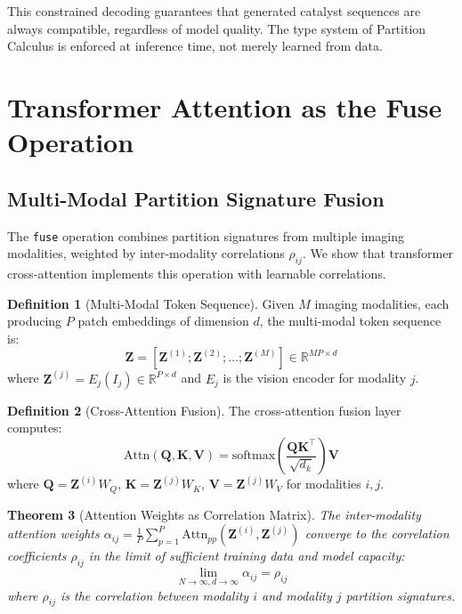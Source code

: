 \documentclass[11pt,twocolumn,a4paper]{article}
\newtheorem{theorem}{Theorem}[section]
\theoremstyle{definition}
\newtheorem{definition}[theorem]{Definition}
\theoremstyle{remark}
\newcommand{\R}{\mathbb{R}}
\begin{document}
This constrained decoding guarantees that generated catalyst sequences are always compatible, regardless of model quality. The type system of Partition Calculus is enforced at inference time, not merely learned from data.

\section{Transformer Attention as the Fuse Operation}
\label{sec:fusion}

\subsection{Multi-Modal Partition Signature Fusion}

The \texttt{fuse} operation combines partition signatures from multiple imaging modalities, weighted by inter-modality correlations $\rho_{ij}$. We show that transformer cross-attention implements this operation with learnable correlations.

\begin{definition}[Multi-Modal Token Sequence]
Given $M$ imaging modalities, each producing $P$ patch embeddings of dimension $d$, the multi-modal token sequence is:
\begin{equation}
\mathbf{Z} = [\mathbf{Z}^{(1)}; \mathbf{Z}^{(2)}; \ldots; \mathbf{Z}^{(M)}] \in \R^{MP \times d}
\end{equation}
where $\mathbf{Z}^{(j)} = E_j(I_j) \in \R^{P \times d}$ and $E_j$ is the vision encoder for modality $j$.
\end{definition}

\begin{definition}[Cross-Attention Fusion]
The cross-attention fusion layer computes:
\begin{equation}
\text{Attn}(\mathbf{Q}, \mathbf{K}, \mathbf{V}) = \text{softmax}\left(\frac{\mathbf{Q}\mathbf{K}^\top}{\sqrt{d_k}}\right)\mathbf{V}
\end{equation}
where $\mathbf{Q} = \mathbf{Z}^{(i)} W_Q$, $\mathbf{K} = \mathbf{Z}^{(j)} W_K$, $\mathbf{V} = \mathbf{Z}^{(j)} W_V$ for modalities $i, j$.
\end{definition}

\begin{theorem}[Attention Weights as Correlation Matrix]
\label{thm:attention_correlation}
The inter-modality attention weights $\alpha_{ij} = \frac{1}{P} \sum_{p=1}^{P} \text{Attn}_{pp}(\mathbf{Z}^{(i)}, \mathbf{Z}^{(j)})$ converge to the correlation coefficients $\rho_{ij}$ in the limit of sufficient training data and model capacity:
\begin{equation}
\lim_{N \to \infty, d \to \infty} \alpha_{ij} = \rho_{ij}
\end{equation}
where $\rho_{ij}$ is the correlation between modality $i$ and modality $j$ partition signatures.
\end{theorem}
\end{document}
